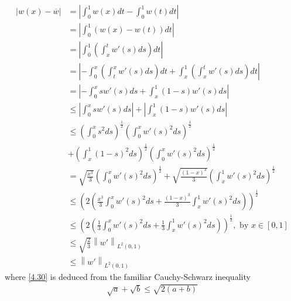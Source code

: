 \documentclass[a4paper]{article}
\numberwithin{equation}{section}
\begin{document}
\begin{align}
\left| {w\left( x \right) - \overline w } \right| &= \left| {\int_0^1 {w\left( x \right)dt}  - \int_0^1 {w\left( t \right)dt} } \right|\\
& = \left| {\int_0^1 {\left( {w\left( x \right) - w\left( t \right)} \right)dt} } \right|\\
 &= \left| {\int_0^1 {\left( {\int_x^t {w'\left( s \right)ds} } \right)dt} } \right|\\
 &= \left| { - \int_0^x {\left( {\int_t^x {w'\left( s \right)ds} } \right)dt}  + \int_x^1 {\left( {\int_x^t {w'\left( s \right)ds} } \right)dt} } \right|\\
 &= \left| { - \int_0^x {sw'\left( s \right)ds}  + \int_x^1 {\left( {1 - s} \right)w'\left( s \right)ds} } \right|\\
 &\le \left| {\int_0^x {sw'\left( s \right)ds} } \right| + \left| {\int_x^1 {\left( {1 - s} \right)w'\left( s \right)ds} } \right|\label{4.26}\\
& \le {\left( {\int_0^x {{s^2}ds} } \right)^{\frac{1}{2}}}{\left( {\int_0^x {w'{{\left( s \right)}^2}ds} } \right)^{\frac{1}{2}}} \\
&+ {\left( {\int_x^1 {{{\left( {1 - s} \right)}^2}ds} } \right)^{\frac{1}{2}}}{\left( {\int_0^x {w'{{\left( s \right)}^2}ds} } \right)^{\frac{1}{2}}}\\
& = \sqrt {\frac{{{x^3}}}{3}} {\left( {\int_0^x {w'{{\left( s \right)}^2}ds} } \right)^{\frac{1}{2}}} + \sqrt {\frac{{{{\left( {1 - x} \right)}^3}}}{3}} {\left( {\int_x^1 {w'{{\left( s \right)}^2}ds} } \right)^{\frac{1}{2}}}\\
& \le {\left( {2\left( {\frac{{{x^3}}}{3}\int_0^x {w'{{\left( s \right)}^2}ds}  + \frac{{{{\left( {1 - x} \right)}^3}}}{3}\int_x^1 {w'{{\left( s \right)}^2}ds} } \right)} \right)^{\frac{1}{2}}}\label{4.30}\\
& \le {\left( {2\left( {\frac{1}{3}\int_0^x {w'{{\left( s \right)}^2}ds}  + \frac{1}{3}\int_x^1 {w'{{\left( s \right)}^2}ds} } \right)} \right)^{\frac{1}{2}}},\mbox{ by }x\in \left[0,1\right]\\
& \le \sqrt {\frac{2}{3}} {\left\| {w'} \right\|_{{L^2}\left( {0,1} \right)}}\label{4.32}\\
& \le {\left\| {w'} \right\|_{{L^2}\left( {0,1} \right)}}
\end{align}
where \eqref{4.30} is deduced from the familiar Cauchy-Schwarz inequality
\begin{align}
\sqrt a  + \sqrt b  \le \sqrt {2\left( {a + b} \right)}
\end{align}
\end{document}
